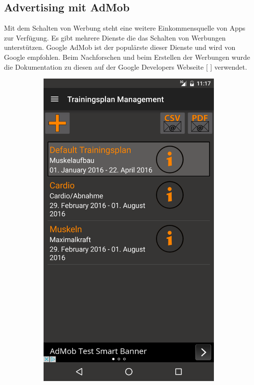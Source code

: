 \documentclass[FIPLY_base.tex]{subfiles}
\author{Andreas Denkmayr}
\date{25. Februar 2016}
\begin{document}
\subsection{Advertising mit AdMob}
Mit dem Schalten von Werbung steht eine weitere Einkommensquelle von Apps zur Verfügung.\newline
Es gibt mehrere Dienste die das Schalten von Werbungen unterstützen. \newline
Google AdMob ist der populärste dieser Dienste und wird von Google empfohlen. \newline
Beim Nachforschen und beim Erstellen der Werbungen wurde die Dokumentation zu diesen auf der Google Developers Webseite [ \cite{gdAdMob}] verwendet.
\ \\
\begin{figure}[h]
	\begin{subfigure}[b]{0.3\textwidth}
	\includegraphics[scale=0.15]{img/adsBanner}

\end{subfigure}
\end{figure}
\end{document}
